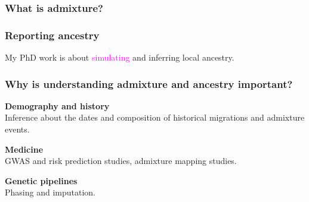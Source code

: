 \documentclass[11pt, mathserif, aspectratio=169]{beamer}
\newcommand{\magenta}[1]{\textcolor{magenta}{#1}}
\newenvironment{wideitemize}{\itemize\addtolength{\itemsep}{10pt}}{\enditemize}
\begin{document}
%
%

\begin{frame}
\frametitle{What is admixture?}
\begin{center}

\end{center}
\end{frame}


\begin{frame}
\frametitle{Reporting ancestry}
\begin{center}

\end{center}
My PhD work is about \magenta{simulating} and inferring local ancestry.
\end{frame}

\begin{frame}
\frametitle{Why is understanding admixture and ancestry important?}

\begin{wideitemize}
\item {\bf Demography and history\\} Inference about the dates and composition of historical migrations and admixture events. 
\item {\bf Medicine\\} GWAS and risk prediction studies, admixture mapping studies.
\item {\bf Genetic pipelines\\} Phasing and imputation.
\end{wideitemize}

\end{frame}
\end{document}
